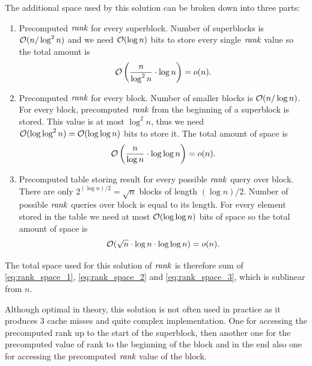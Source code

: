 The additional space used by this solution can be broken down into three parts:
\begin{enumerate}
    \item Precomputed $\mathit{rank}$ for every superblock. Number of superblocks is $\mathcal{O}(n/\log^2 n)$
    and we need $\mathcal{O}(\log n)$ bits to store every single $\mathit{rank}$ value so the total amount is
    \begin{equation}
        \mathcal{O}\left(\frac{n}{\log^2 n}\cdot \log n\right) = o(n).
        \label{eq:rank_space_1}
    \end{equation}
    \item Precomputed $\mathit{rank}$ for every block. Number of smaller blocks is $\mathcal{O}(n/\log n)$. For every
    block, precomputed $\mathit{rank}$ from the beginning of a superblock is stored. This value is at most $\log^2 n$,
    thus we need $\mathcal{O}(\log\log^2 n)=\mathcal{O}(\log\log n)$ bits to store it. The total amount of space is
    \begin{equation}
        \mathcal{O}\left(\frac{n}{\log n}\cdot \log\log n\right)=o(n).
        \label{eq:rank_space_2}
    \end{equation}
    \item Precomputed table storing result for every possible $\mathit{rank}$ query over block. There are only
    $2^{(\log n)/2} = \sqrt{n}$ blocks of length $(\log n)/2$. Number of possible $\mathit{rank}$ queries over
    block is equal to its length. For every element stored in the table we need at most $\mathcal{O}(\log\log n)$
    bits of space so the total amount of space is
    \begin{equation}
        \mathcal{O}(\sqrt{n}\cdot \log n\cdot \log\log n)=o(n).
        \label{eq:rank_space_3}
    \end{equation}
\end{enumerate}

The total space used for this solution of $\mathit{rank}$ is therefore sum of \ref{eq:rank_space_1}, \ref{eq:rank_space_2} and
\ref{eq:rank_space_3}, which is sublinear from $n$.

Although optimal in theory, this solution is not often used in practice as it produces
3 cache misses and quite complex implementation. One for accessing the precomputed rank up
to the start of the superblock, then another one for the precomputed value of rank to the
beginning of the block and in the end also one for accessing the precomputed $\mathit{rank}$ value
of the block.


